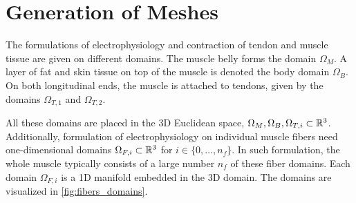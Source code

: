 %  
\chapter{Generation of Meshes}

The formulations of electrophysiology and contraction of tendon and muscle tissue are given on different domains.
The muscle belly forms the domain $\Omega_M$. A layer of fat and skin tissue on top of the muscle is denoted the body domain $\Omega_B$.
On both longitudinal ends, the muscle is attached to tendons, given by the domains $\Omega_{T,1}$ and $\Omega_{T,2}$.

All these domains are placed in the 3D Euclidean space, $\Omega_M,\Omega_B,\Omega_{T,i} \subset \mathbb{R}^3$.
Additionally, formulation of electrophysiology on individual muscle fibers need one-dimensional domains $\Omega_{F,i} \subset \mathbb{R}^3$ for $i \in \{0,\dots,n_f\}$. In such formulation, the whole muscle typically consists of a large number $n_f$ of these fiber domains.
Each domain $\Omega_{F,i}$ is a 1D manifold embedded in the 3D domain. The domains are visualized in \cref{fig:fibers_domains}.

